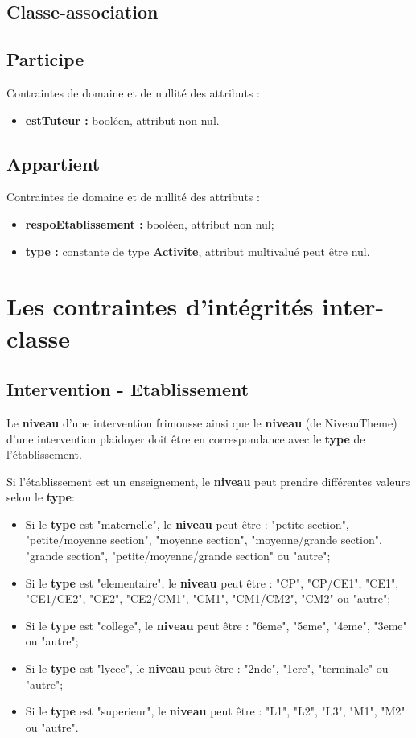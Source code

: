 \documentclass[asi, sansVersion]{picInsa}
\begin{document}
\subsection{Classe-association}

\subsection*{Participe}
Contraintes de domaine et de nullité des attributs :
\begin{itemize}
	\item \textbf{estTuteur :} booléen, attribut non nul.\\
\end{itemize}

\subsection*{Appartient}
Contraintes de domaine et de nullité des attributs :
\begin{itemize}
	\item \textbf{respoEtablissement :} booléen, attribut non nul;
	\item \textbf{type :} constante de type \textbf{Activite}, attribut multivalué peut être nul.
\end{itemize}


\section{Les contraintes d'intégrités inter-classe}


\subsection*{Intervention - Etablissement}
Le \textbf{niveau} d'une intervention frimousse ainsi que le \textbf{niveau} (de NiveauTheme) d'une intervention plaidoyer doit être en correspondance avec le \textbf{type} de l'établissement.  

Si l'établissement est un enseignement, le \textbf{niveau} peut prendre différentes valeurs selon le \textbf{type}:
\begin{itemize}
\item Si le \textbf{type} est "maternelle", le \textbf{niveau} peut être : "petite section", "petite/moyenne section", "moyenne section", "moyenne/grande section", "grande section", "petite/moyenne/grande section" ou "autre";
\item Si le \textbf{type} est "elementaire", le \textbf{niveau} peut être : "CP", "CP/CE1", "CE1", "CE1/CE2", "CE2", "CE2/CM1", "CM1", "CM1/CM2", "CM2" ou "autre";
\item Si le \textbf{type} est "college", le \textbf{niveau} peut être : "6eme", "5eme", "4eme", "3eme" ou "autre";
\item Si le \textbf{type} est "lycee", le \textbf{niveau} peut être : "2nde", "1ere", "terminale" ou "autre";
\item Si le \textbf{type} est "superieur", le \textbf{niveau} peut être : "L1", "L2", "L3", "M1", "M2" ou "autre".
\end{itemize}
\end{document}
